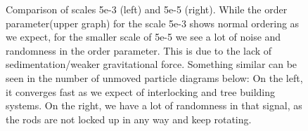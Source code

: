 \begin{figure}
\begin{minipage}[t]{0.45\textwidth}
  \end{minipage}
  \caption{Comparison of scales 5e-3 (left) and 5e-5 (right). While the order parameter(upper graph) for the scale 5e-3 shows normal ordering as we expect, for the smaller scale of 5e-5 we see a lot of noise and randomness in the order parameter. This is due to the lack of sedimentation/weaker gravitational force. Something similar can be seen in the number of unmoved particle diagrams below: On the left, it converges fast as we expect of interlocking and tree building systems. On the right, we have a lot of randomness in that signal, as the rods are not locked up in any way and keep rotating.}
  \label{fig:sca_comp2}
\end{figure}
